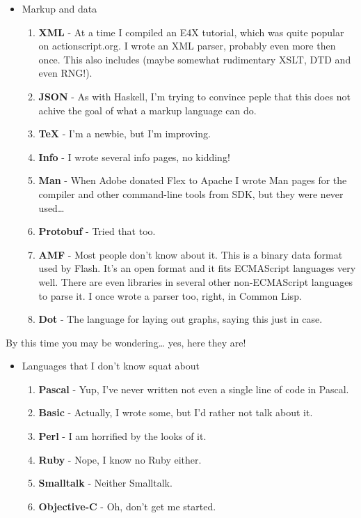 \documentclass[oneside]{memoir}
\begin{document}
\begin{itemize}
\item Markup and data
\begin{enumerate}
\item \textbf{XML} - At a time I compiled an E4X tutorial, which was quite
popular on actionscript.org.  I wrote an XML parser, probably even more
then once.  This also includes (maybe somewhat rudimentary XSLT, DTD and
even RNG!).
\item \textbf{JSON} - As with Haskell, I'm trying to convince peple that this does
not achive the goal of what a markup language can do.
\item \textbf{\TeX{}} - I'm a newbie, but I'm improving.
\item \textbf{Info} - I wrote several info pages, no kidding!
\item \textbf{Man} - When Adobe donated Flex to Apache I wrote Man pages for the
compiler and other command-line tools from SDK, but they were never
used\ldots{}
\item \textbf{Protobuf} - Tried that too.
\item \textbf{AMF} - Most people don't know about it.  This is a binary data format
used by Flash.  It's an open format and it fits ECMAScript languages very
well.  There are even libraries in several other non-ECMAScript languages
to parse it.  I once wrote a parser too, right, in Common Lisp.
\item \textbf{Dot} - The language for laying out graphs, saying this just in case.
\end{enumerate}
\end{itemize}

By this time you may be wondering\ldots{} yes, here they are!

\begin{itemize}
\item Languages that I don't know squat about
\begin{enumerate}
\item \textbf{Pascal} - Yup, I've never written not even a single line of code in
Pascal.
\item \textbf{Basic} - Actually, I wrote some, but I'd rather not talk about it.
\item \textbf{Perl} - I am horrified by the looks of it.
\item \textbf{Ruby} - Nope, I know no Ruby either.
\item \textbf{Smalltalk} - Neither Smalltalk.
\item \textbf{Objective-C} - Oh, don't get me started.
\end{enumerate}
\end{itemize}
\end{document}
